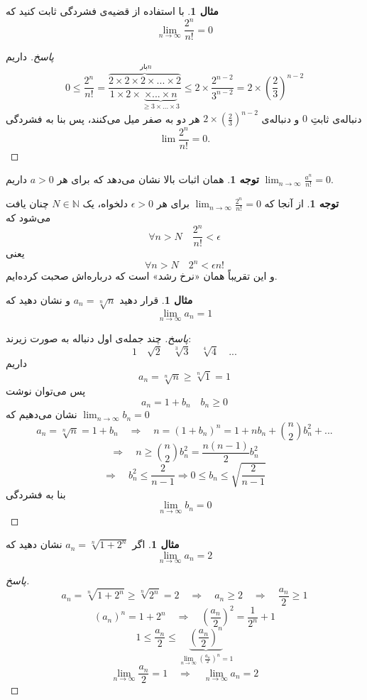 \documentclass[12pt,a4paper]{article}
\theoremstyle{definition}
\newtheorem{mesal}[thm]{مثال}
\newtheorem{tav}[thm]{توجه}
\begin{document}
\begin{mesal}
با استفاده از قضیه‌ی فشردگی
ثابت کنید که 
\[
\lim_{n \to \infty}\frac{2^n}{n!}=0
\]
\end{mesal}
\begin{proof}[پاسخ]
داریم
\[
0 \leqslant
\frac{2^n}{n!}=
 \frac{\overbrace{2 \times 2 \times 2 \times ... \times 2}^{\text{ بار}n}}{1 \times 2 \times \underbrace{ \times ... \times n}_{\geq 3 \times ... \times 3}} \leqslant 2 \times \frac{2^{n-2}}{3^{n-2}}=2 \times (\frac{2}{3})^{n-2}
\]
دنباله‌ی ثابتِ
$0$
و دنباله‌ی
$2 \times (\frac{2}{3})^{n-2}$
هر دو به صفر میل می‌کنند، پس
بنا به فشردگی
\[
\lim \frac{2^n}{n!}=0.
\]
\end{proof}
\begin{tav}
همان اثبات بالا نشان می‌دهد که برای هر
$a>0$
داریم
$\lim _{n\to \infty}\frac{a^n}{n!}=0$.
\end{tav}
\begin{tav}
از آنجا که
$\lim _{n\to \infty}\frac{2^n}{n!}=0$
برای هر
$\epsilon>0$
دلخواه، یک
$N\in\mathbb{N}$
چنان یافت می‌شود که 
\[
\forall n>N \quad \frac{2^n}{n!}<\epsilon
\]
یعنی
\[
\forall n>N \quad 2^n<\epsilon n!
\]
و این  تقریباً همان «نرخ‌ رشد» است که درباره‌اش صحبت کرده‌ایم. 
\end{tav}
\begin{mesal}
قرار دهید 
$a_n = \sqrt[n]{n}$
و نشان دهید که 
\[
\lim_{n \to \infty}a_n=1
\]
\end{mesal}
\begin{proof}[پاسخ]
چند جمله‌ی اول دنباله به صورت زیرند:
\[
1 \quad \sqrt{2} \quad \sqrt[3]{3} \quad \sqrt[4]{4} \quad ...
\]
داریم
\[
a_n = \sqrt[n]{n} \geqslant \sqrt[n]{1} =1
\]
پس می‌توان نوشت
\[
a_n=1+b_n \quad b_n \geqslant 0
\]
نشان می‌دهیم که 
$\lim_{n \to \infty}b_n=0$
\[
a_n=\sqrt[n]{n}=1+b_n \quad \Rightarrow \quad n=(1+b_n)^n = 1+nb_n+\binom{n}{2}b_n^2+... 
\]
\[
\Rightarrow \quad n\geqslant \binom{n}{2}b_n^2=\frac{n(n-1)}{2}b_n^2
\]
\[
\Rightarrow \quad b_n^2 \leqslant \frac{2}{n-1} \Rightarrow 0 \leqslant b_n \leqslant \sqrt{\frac{2}{n-1}}
\]
بنا به فشردگی
\[
\lim_{n \to \infty}b_n=0
\]
\end{proof}
\begin{mesal}
اگر
$a_n=\sqrt[n]{1+2^n}$
نشان دهید که 
\[
\lim_{n \to \infty}a_n=2
\]
\end{mesal}
\begin{proof}[پاسخ]
\[
a_n=\sqrt[n]{1+2^n} \geqslant \sqrt[n]{2^n}=2 \quad \Rightarrow \quad a_n\geqslant 2 \quad \Rightarrow \quad \frac{a_n}{2}\geqslant 1
\]
\[
(a_n)^n = 1+2^n \quad \Rightarrow \quad (\frac{a_n}{2})^2 = \frac{1}{2^n}+1
\]
\[
1 \leqslant \frac{a_n}{2} \leqslant \underbrace{(\frac{a_n}{2})^n}_{\lim_{n \to \infty}(\frac{a_n}{2})^n = 1}
\]
\[
\lim_{n \to \infty}\frac{a_n}{2} = 1 \quad \Rightarrow \quad \lim_{n \to \infty}a_n = 2
\]
\end{proof}
\end{document}
